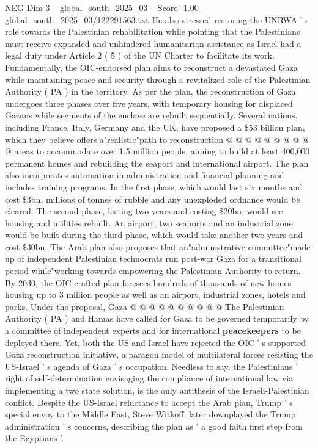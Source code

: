\begin{textsample}{NEG Dim 3 – global\_south\_2025\_03 – Score -1.00 – global\_south\_2025\_03/122291563.txt}
He also stressed restoring the UNRWA ' s role towards the Palestinian rehabilitation while pointing that the Palestinians must receive expanded and unhindered humanitarian assistance as Israel had a legal duty under Article 2 ( 5 ) of the UN Charter to facilitate its work.
Fundamentally, the OIC-endorsed plan aims to reconstruct a devastated Gaza while maintaining peace and security through a revitalized role of the Palestinian Authority ( PA ) in the territory.
As per the plan, the reconstruction of Gaza undergoes three phases over five years, with temporary housing for displaced Gazans while segments of the enclave are rebuilt sequentially.
Several nations, including France, Italy, Germany and the UK, have proposed a \$53 billion plan, which they believe offers a"realistic"path to reconstruction @ @ @ @ @ @ @ @ @ @ areas to accommodate over 1.5 million people, aiming to build at least 400,000 permanent homes and rebuilding the seaport and international airport.
The plan also incorporates automation in administration and financial planning and includes training programs.
In the first phase, which would last six months and cost \$3bn, millions of tonnes of rubble and any unexploded ordnance would be cleared.
The second phase, lasting two years and costing \$20bn, would see housing and utilities rebuilt.
An airport, two seaports and an industrial zone would be built during the third phase, which would take another two years and cost \$30bn.
The Arab plan also proposes that an"administrative committee"made up of independent Palestinian technocrats run post-war Gaza for a transitional period while"working towards empowering the Palestinian Authority to return.
By 2030, the OIC-crafted plan foresees hundreds of thousands of new homes housing up to 3 million people as well as an airport, industrial zones, hotels and parks.
Under the proposal, Gaza @ @ @ @ @ @ @ @ @ @ The Palestinian Authority ( PA ) and Hamas have called for Gaza to be governed temporarily by a committee of independent experts and for international \textbf{peacekeepers} to be deployed there.
Yet, both the US and Israel have rejected the OIC ' s supported Gaza reconstruction initiative, a paragon model of multilateral forces resisting the US-Israel ' s agenda of Gaza ' s occupation.
Needless to say, the Palestinians ' right of self-determination envisaging the compliance of international law via implementing a two state solution, is the only antithesis of the Israeli-Palestinian conflict.
Despite the US-Israel reluctance to accept the Arab plan, Trump ' s special envoy to the Middle East, Steve Witkoff, later downplayed the Trump administration ' s concerns, describing the plan as ' a good faith first step from the Egyptians '.

\end{textsample}
